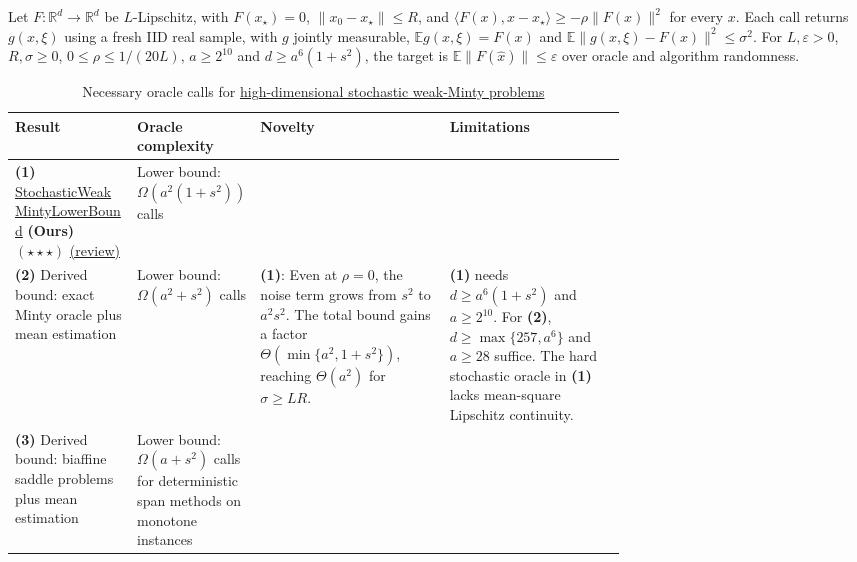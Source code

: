 \begin{table}[tp]
\centering
\caption{Necessary oracle calls for \href{https://github.com/k3nfalt/longtails/blob/main/LongTails/Setups/HighDimensionalStochasticWeakMinty.lean}{high-dimensional stochastic weak-Minty problems}}\label{tab:HighDimensionalStochasticWeakMinty}
\parbox{\linewidth}{\footnotesize
Let $F:\mathbb R^d\to\mathbb R^d$ be $L$-Lipschitz, with $F(x_\star)=0$, $\|x_0-x_\star\|\le R$, and $\langle F(x),x-x_\star\rangle\ge-\rho\|F(x)\|^2$ for every $x$. Each call returns $g(x,\xi)$ using a fresh IID real sample, with $g$ jointly measurable, $\mathbb E g(x,\xi)=F(x)$ and $\mathbb E\|g(x,\xi)-F(x)\|^2\le\sigma^2$. For $L,\varepsilon>0$, $R,\sigma\ge0$, $0\le\rho\le1/(20L)$, $a\ge2^{10}$ and $d\ge a^6(1+s^2)$, the target is $\mathbb E\|F(\hat x)\|\le\varepsilon$ over oracle and algorithm randomness.}\par\smallskip
\begin{threeparttable}
\footnotesize
\setlength{\tabcolsep}{4pt}\renewcommand{\arraystretch}{1.25}
\begin{tabularx}{\linewidth}{@{}>{\raggedright\arraybackslash}p{0.20\linewidth}>{\raggedright\arraybackslash}p{0.20\linewidth}>{\raggedright\arraybackslash}p{0.31\linewidth}>{\raggedright\arraybackslash}X@{}}
\toprule
\textbf{Result} & \textbf{Oracle complexity} & \textbf{Novelty} & \textbf{Limitations} \\
\midrule
\textbf{(1)} \href{https://github.com/k3nfalt/longtails/blob/main/LongTails/Theorems/StochasticWeakMintyLowerBound.lean}{Stochastic\allowbreak Weak\allowbreak Minty\allowbreak Lower\allowbreak Bound} \textbf{(Ours)} $(\star\star\star)$ \href{https://github.com/k3nfalt/longtails/blob/main/scripts/reviews/StochasticWeakMintyLowerBound.md}{(review)}
& Lower bound: $\Omega(a^2(1+s^2))$ calls & & \\
\midrule[1.2pt]
\textbf{(2)} Derived bound: exact Minty oracle \citep{hdwmEuclidean2026} plus mean estimation
& Lower bound: $\Omega(a^2+s^2)$ calls
& \textbf{(1)}: Even at $\rho=0$, the noise term grows from $s^2$ to $a^2s^2$. The total bound gains a factor $\Theta(\min\{a^2,1+s^2\})$, reaching $\Theta(a^2)$ for $\sigma\ge LR$.
& \textbf{(1)} needs $d\ge a^6(1+s^2)$ and $a\ge2^{10}$. For \textbf{(2)}, $d\ge\max\{257,a^6\}$ and $a\ge28$ suffice. The hard stochastic oracle in \textbf{(1)} lacks mean-square Lipschitz continuity. \\
\midrule
\textbf{(3)} Derived bound: biaffine saddle problems \citep[Thm.~3]{ewmYoonRyu2021Verified} plus mean estimation
& Lower bound: $\Omega(a+s^2)$ calls for deterministic span methods on monotone instances

\end{tabularx}
\end{threeparttable}
\end{table}
